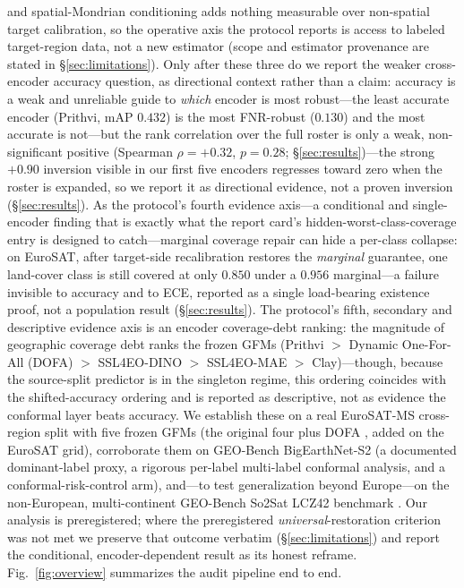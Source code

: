 \documentclass[preprint,11pt,authoryear]{elsarticle}
\begin{document}
and spatial-Mondrian conditioning adds nothing measurable over non-spatial target calibration, so the
operative axis the protocol reports is access to labeled target-region data, not a new estimator (scope
and estimator provenance are stated in \S\ref{sec:limitations}). Only after these three do we report the
weaker cross-encoder accuracy question, as directional context rather than a claim: accuracy is a weak and
unreliable guide to \emph{which} encoder is most robust---the least accurate encoder (Prithvi, mAP $0.432$)
is the most FNR-robust ($0.130$) and the most accurate is not---but the rank correlation over the full
roster is only a weak, non-significant positive (Spearman $\rho=+0.32$, $p{=}0.28$;
\S\ref{sec:results})---the strong $+0.90$ inversion visible in our first five encoders regresses
toward zero when the roster is expanded, so we report it as directional evidence, not a proven inversion
(\S\ref{sec:results}). As the protocol's fourth evidence axis---a conditional and single-encoder finding
that is exactly what the report card's hidden-worst-class-coverage entry is designed to catch---marginal
coverage repair can hide a per-class collapse: on EuroSAT, after target-side recalibration restores the
\emph{marginal} guarantee, one land-cover class is still covered at only $0.850$ under a $0.956$
marginal---a failure invisible to accuracy and to ECE, reported as a single load-bearing existence proof,
not a population result (\S\ref{sec:results}). The protocol's fifth, secondary and descriptive evidence
axis is an encoder coverage-debt ranking: the magnitude of geographic coverage debt ranks the frozen GFMs
(Prithvi $>$ Dynamic One-For-All (DOFA) \citep{xiong2024dofa} $>$ SSL4EO-DINO $>$ SSL4EO-MAE $>$ Clay)---though, because the
source-split predictor is in the singleton regime, this ordering coincides with the shifted-accuracy
ordering and is reported as descriptive, not as evidence the conformal layer beats accuracy. We establish
these on a real EuroSAT-MS \citep{helber2019eurosat} cross-region split with five frozen GFMs (the
original four plus DOFA \citep{xiong2024dofa}, added on the EuroSAT grid), corroborate them on GEO-Bench
BigEarthNet-S2 \citep{lacoste2023geobench,sumbul2019bigearthnet} (a documented dominant-label proxy, a
rigorous per-label multi-label conformal analysis, and a conformal-risk-control arm), and---to test
generalization beyond Europe---on the non-European, multi-continent GEO-Bench So2Sat LCZ42 benchmark
\citep{zhu2020so2sat}. Our analysis is preregistered; where the preregistered \emph{universal}-restoration
criterion was not met we preserve that outcome verbatim (\S\ref{sec:limitations}) and report the
conditional, encoder-dependent result as its honest reframe. Fig.~\ref{fig:overview} summarizes the audit
pipeline end to end.
\end{document}
